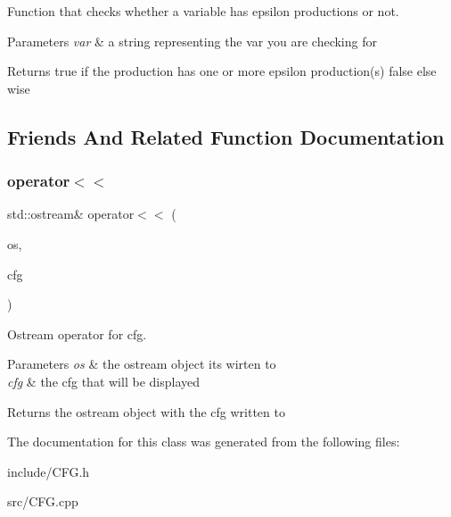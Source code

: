 Function that checks whether a variable has epsilon productions or not. 


\begin{DoxyParams}{Parameters}
{\em var} & a string representing the var you are checking for \\
\hline
\end{DoxyParams}
\begin{DoxyReturn}{Returns}
true if the production has one or more epsilon production(s) false else wise 
\end{DoxyReturn}


\subsection{Friends And Related Function Documentation}
\mbox{\label{classCFG_aa896f5667e2f966fb942244b746beaad}} 
\subsubsection{\texorpdfstring{operator$<$$<$}{operator<<}}
{\footnotesize\ttfamily std\+::ostream\& operator$<$$<$ (\begin{DoxyParamCaption}\item[{std\+::ostream \&}]{os,  }\item[{\hyperlink{classCFG}{C\+FG} \&}]{cfg }\end{DoxyParamCaption})\hspace{0.3cm}{\ttfamily [friend]}}



Ostream operator for cfg. 


\begin{DoxyParams}{Parameters}
{\em os} & the ostream object its wirten to \\
\hline
{\em cfg} & the cfg that will be displayed \\
\hline
\end{DoxyParams}
\begin{DoxyReturn}{Returns}
the ostream object with the cfg written to 
\end{DoxyReturn}


The documentation for this class was generated from the following files\+:\begin{DoxyCompactItemize}
\item 
include/C\+F\+G.\+h\item 
src/C\+F\+G.\+cpp\end{DoxyCompactItemize}
